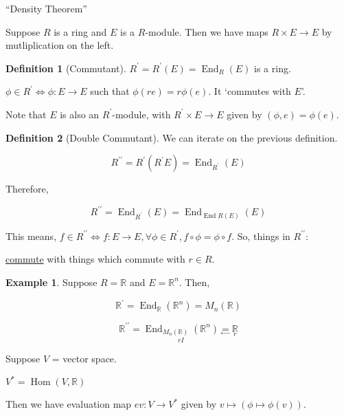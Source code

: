 \documentclass{article}
\theoremstyle{definition}
\newtheorem*{example}{Example}
\newtheorem*{definition}{Definition}
\newcommand{\End}{\operatorname{End}}
\newcommand{\Hom}{\operatorname{Hom}}
\begin{document}
``Density Theorem''

Suppose \(R\) is a ring and \(E\) is a \(R\)-module. Then we have maps \(R \times E \to E\) by mutliplication on the left.

\begin{definition}
    [Commutant]

    \(R^{\prime} = R^{\prime} (E) = \End_R(E)\) is a ring. 

    \(\phi \in R^{\prime} \iff \phi : E \to E\) such that \(\phi(re) = r \phi (e)\). It `commutes with \(E\)'.

    Note that \(E \) is also an \(R^{\prime}\)-module, with \(R^{\prime} \times E \to E\) given by \((\phi , e) = \phi(e)\). 
\end{definition}

\begin{definition}
    [Double Commutant]

    We can iterate on the previous definition.

    \[
        R^{\prime\prime} = R^{\prime} (R^{\prime} E) = \End_{R^{\prime}}(E)
    \]
\end{definition}

Therefore,

\[
    R^{\prime\prime} = \End_{R^{\prime}}(E) = \End_{\End{R}(E)}(E)
\]

This means, \(f\in R^{\prime\prime} \iff f: E\to E, \forall \phi\in R^{\prime} , f \circ \phi = \phi \circ f\). So, things in \(R^{\prime\prime}\):

\begin{center}
    \underline{commute} with things which commute with \(r\in R\).
\end{center}

\begin{example}
    Suppose \(R = \mathbb{R}\) and \(E = \mathbb{R}^n\). Then,

    \[
        \mathbb{R} ^{\prime}  = \End_{\mathbb{R}}(\mathbb{R}^n) = M_n(\mathbb{R})
    \]

    \[
        \mathbb{R}^{\prime\prime} = \underset{rI}{\End_{M_n(\mathbb{R})}(\mathbb{R}^n)} \underset{\leftarrow}{=} \underset{r}{\mathbb{R}}
    \]

\end{example}

Suppose \(V\) = vector space.

\(V^{\ast} = \Hom(V,\mathbb{R})\) 

Then we have evaluation map \(ev: V \to V^{\ast} \) given by \(v \mapsto (\phi \mapsto \phi(v))\).
\end{document}
